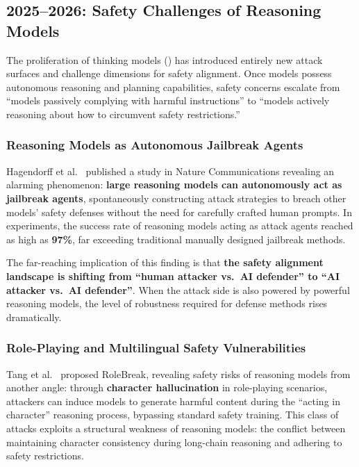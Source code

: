 
\subsection{2025--2026: Safety Challenges of Reasoning Models}
\label{sec:t3-reasoning-safety}

The proliferation of thinking models () has introduced entirely new attack surfaces and challenge dimensions for safety alignment.
Once models possess autonomous reasoning and planning capabilities, safety concerns escalate from ``models passively complying with harmful instructions''
to ``models actively reasoning about how to circumvent safety restrictions.''

\subsubsection{Reasoning Models as Autonomous Jailbreak Agents}

Hagendorff et al.\ \cite{hagendorff2026jailbreakagents} published a study in Nature Communications revealing an alarming phenomenon:
\textbf{large reasoning models can autonomously act as jailbreak agents},
spontaneously constructing attack strategies to breach other models' safety defenses without the need for carefully crafted human prompts.
In experiments, the success rate of reasoning models acting as attack agents reached as high as \textbf{97\%},
far exceeding traditional manually designed jailbreak methods.

The far-reaching implication of this finding is that
\textbf{the safety alignment landscape is shifting from ``human attacker vs.\ AI defender''
to ``AI attacker vs.\ AI defender''}.
When the attack side is also powered by powerful reasoning models,
the level of robustness required for defense methods rises dramatically.

\subsubsection{Role-Playing and Multilingual Safety Vulnerabilities}

Tang et al.\ \cite{tang2025rolebreak} proposed RoleBreak, revealing safety risks of reasoning models from another angle:
through \textbf{character hallucination} in role-playing scenarios,
attackers can induce models to generate harmful content during the ``acting in character'' reasoning process,
bypassing standard safety training.
This class of attacks exploits a structural weakness of reasoning models:
the conflict between maintaining character consistency during long-chain reasoning and adhering to safety restrictions.

